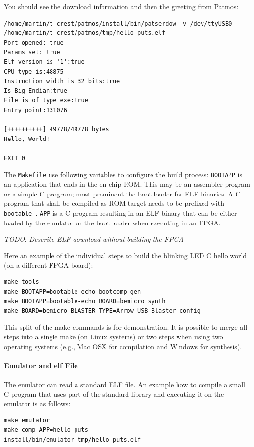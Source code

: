 \documentclass[a4paper,fontsize=10pt,twoside,DIV15,BCOR12mm,headinclude=true,footinclude=false,pagesize,bibtotoc]{scrbook}
\newcommand{\code}[1]{{\texttt{#1}}}
\newcommand{\todo}[1]{{\emph{TODO: #1}}}
\begin{document}
You should see the download information and then the greeting from Patmos:

\begin{verbatim}
/home/martin/t-crest/patmos/install/bin/patserdow -v /dev/ttyUSB0 /home/martin/t-crest/patmos/tmp/hello_puts.elf
Port opened: true
Params set: true
Elf version is '1':true
CPU type is:48875
Instruction width is 32 bits:true
Is Big Endian:true
File is of type exe:true
Entry point:131076

[++++++++++] 49778/49778 bytes
Hello, World!

EXIT 0
\end{verbatim}

The \code{Makefile} use following variables to configure the build process:
\code{BOOTAPP} is an application that ends in the on-chip ROM. This may
be an assembler program or a simple C program;
most prominent the boot loader for ELF binaries.
A C program that shall be compiled as ROM target needs to be prefixed
with \code{bootable-}.
\code{APP} is a C program resulting in an ELF binary that can be either
loaded by the emulator or the boot loader when executing in an FPGA.

\todo{Describe ELF download without building the FPGA}


Here an example of the individual steps to build the blinking LED C
hello world (on a different FPGA board):
\begin{verbatim}
make tools
make BOOTAPP=bootable-echo bootcomp gen
make BOOTAPP=bootable-echo BOARD=bemicro synth
make BOARD=bemicro BLASTER_TYPE=Arrow-USB-Blaster config
\end{verbatim}

This split of the make commands is for demonstration. It is
possible to merge all steps into a single make (on Linux
systems) or two steps when using two operating
systems (e.g., Mac OSX for compilation and Windows for synthesis).

\paragraph{Emulator and elf File}

The emulator can read a standard ELF file. An example how to compile
a small C program that uses part of the standard library and executing
it on the emulator is as follows:

\begin{verbatim}
make emulator
make comp APP=hello_puts
install/bin/emulator tmp/hello_puts.elf
\end{verbatim}
\end{document}
